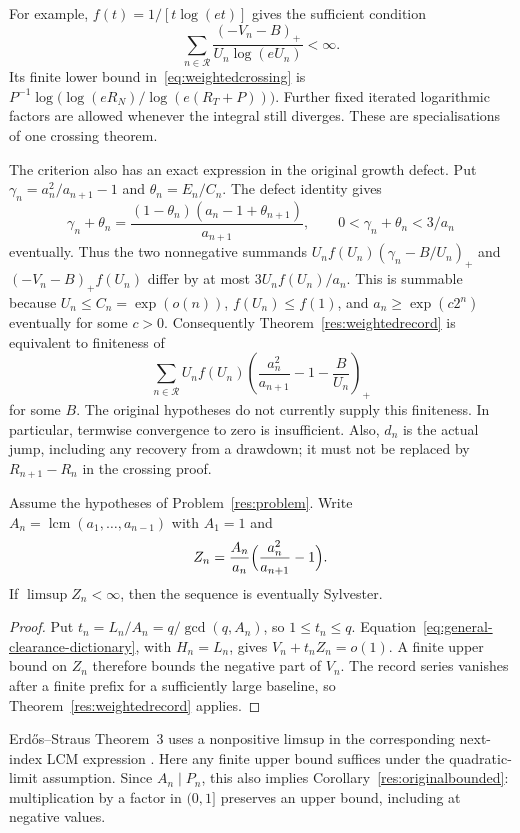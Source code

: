 \documentclass[11pt]{article}
\begin{document}
For example, $f(t)=1/[t\log(et)]$ gives the sufficient condition
\[
 \sum_{n\in\mathcal R}\frac{(-V_n-B)_+}{U_n\log(eU_n)}<\infty.
\]
Its finite lower bound in~\eqref{eq:weightedcrossing} is
$P^{-1}\log\bigl(\log(eR_N)/\log(e(R_T+P))\bigr)$.
Further fixed iterated logarithmic factors are allowed whenever the integral
still diverges. These are specialisations of one crossing theorem.

The criterion also has an exact expression in the original growth defect.
Put $\gamma_n=a_n^2/a_{n+1}-1$ and $\theta_n=E_n/C_n$. The defect identity
gives
\[
 \gamma_n+\theta_n=
 \frac{(1-\theta_n)(a_n-1+\theta_{n+1})}{a_{n+1}},
 \qquad 0<\gamma_n+\theta_n<3/a_n
\]
eventually. Thus the two nonnegative summands
$U_nf(U_n)(\gamma_n-B/U_n)_+$ and $(-V_n-B)_+f(U_n)$ differ by at most
$3U_nf(U_n)/a_n$. This is summable because
$U_n\le C_n=\exp(o(n))$, $f(U_n)\le f(1)$, and
$a_n\ge\exp(c2^n)$ eventually for some $c>0$.
Consequently Theorem~\ref{res:weightedrecord} is equivalent to finiteness of
\begin{equation}\label{eq:weightedgrowth}
 \sum_{n\in\mathcal R}U_nf(U_n)
 \left(\frac{a_n^2}{a_{n+1}}-1-\frac B{U_n}\right)_+
\end{equation}
for some $B$. The original hypotheses do not currently supply this
finiteness. In particular, termwise convergence to zero is insufficient.
Also, $d_n$ is the actual jump, including any recovery from a drawdown; it
must not be replaced by $R_{n+1}-R_n$ in the crossing proof.

\begin{corollary}\label{res:lcmbounded}
Assume the hypotheses of Problem~\ref{res:problem}. Write
$A_n=\operatorname{lcm}(a_1,\ldots,a_{n-1})$ with $A_1=1$ and
\[
 Z_n=\frac{A_n}{a_n}\Bigl(\frac{a_n^2}{a_{n+1}}-1\Bigr).
\]
If $\limsup Z_n<\infty$, then the sequence is eventually Sylvester.
\end{corollary}

\begin{proof}
Put $t_n=L_n/A_n=q/\gcd(q,A_n)$, so $1\le t_n\le q$.
Equation~\eqref{eq:general-clearance-dictionary}, with $H_n=L_n$, gives
$V_n+t_nZ_n=o(1)$. A finite upper bound on $Z_n$ therefore bounds the
negative part of $V_n$. The record series vanishes after a finite prefix
for a sufficiently large baseline, so Theorem~\ref{res:weightedrecord}
applies.
\end{proof}

Erd\H{o}s--Straus Theorem~3 uses a nonpositive limsup in the corresponding
next-index LCM expression \cite{erdosstraus1964}. Here any finite upper
bound suffices under the quadratic-limit assumption. Since $A_n\mid P_n$,
this also implies Corollary~\ref{res:originalbounded}: multiplication by
a factor in $(0,1]$ preserves an upper bound, including at negative values.
\end{document}
